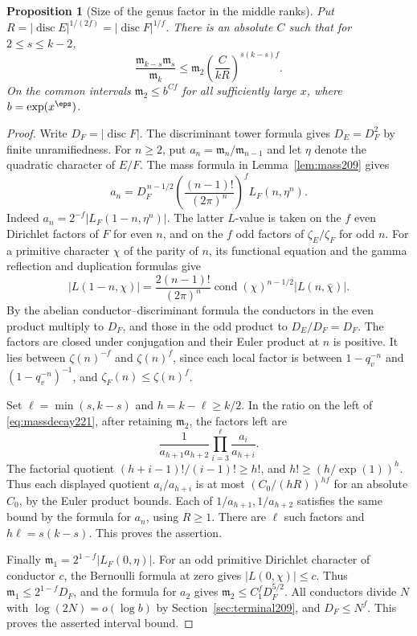\documentclass[a4paper,11pt]{article}
\newtheorem{proposition}{Proposition}[section]
\theoremstyle{definition}
\theoremstyle{remark}
\numberwithin{equation}{section}
\begin{document}
\begin{proposition}[Size of the genus factor in the middle ranks]
\label{prop:massdecay221}
Put \(R=|\operatorname{disc}E|^{1/(2f)}
       =|\operatorname{disc}F|^{1/f}\).
There is an absolute \(C\) such that for \(2\le s\le k-2\),
\begin{equation}
        \frac{\mathfrak m_{k-s}\mathfrak m_s}{\mathfrak m_k}
          \le \mathfrak m_2
                   \left(\frac{C}{kR}\right)^{s(k-s)f}.
                   \label{eq:massdecay221}
\end{equation}
On the common intervals \(\mathfrak m_2\le b^{C f}\) for
all sufficiently large \(x\), where \(b=\exp(x^\eps)\).
\end{proposition}
\begin{proof}
Write \(D_F=|\operatorname{disc}F|\). The discriminant tower
formula gives \(D_E=D_F^2\) by finite unramifiedness.
For \(n\ge2\), put \(a_n=\mathfrak m_n/\mathfrak m_{n-1}\)
and let \(\eta\) denote the quadratic character of \(E/F\).
The mass formula in Lemma~\ref{lem:mass209} gives
\[
 a_n=D_F^{\,n-1/2}
       \left(\frac{(n-1)!}{(2\pi)^n}\right)^f
                       L_F(n,\eta^n).
\]
Indeed \(a_n=2^{-f}|L_F(1-n,\eta^n)|\). The latter \(L\)-value
is taken on the \(f\) even Dirichlet factors of \(F\) for
even \(n\), and on the \(f\) odd factors of
\(\zeta_E/\zeta_F\) for odd \(n\). For a primitive character
\(\chi\) of the parity of \(n\), its functional equation and
the gamma reflection and duplication formulas give
\[
 |L(1-n,\chi)|=
  \frac{2(n-1)!}{(2\pi)^n}
       \operatorname{cond}(\chi)^{n-1/2}|L(n,\bar\chi)|.
\]
By the abelian conductor--discriminant formula the conductors
in the even product multiply to \(D_F\), and those in the
odd product to \(D_E/D_F=D_F\). The factors are closed under
conjugation and their Euler product at \(n\) is positive.
It lies between \(\zeta(n)^{-f}\) and \(\zeta(n)^f\), since
each local factor is between \(1-q_v^{-n}\) and
\((1-q_v^{-n})^{-1}\), and \(\zeta_F(n)\le\zeta(n)^f\).

Set \(\ell=\min(s,k-s)\) and \(h=k-\ell\ge k/2\).
In the ratio on the left of \eqref{eq:massdecay221}, after
retaining \(\mathfrak m_2\), the factors left are
\[
       \frac1{a_{h+1}a_{h+2}}
                  \prod_{i=3}^{\ell}\frac{a_i}{a_{h+i}} .
\]
The factorial quotient \((h+i-1)!/(i-1)!\ge h!\),
and \(h!\ge(h/\exp(1))^h\). Thus each displayed quotient
\(a_i/a_{h+i}\) is at most \((C_0/(hR))^{hf}\) for an
absolute \(C_0\), by the Euler product bounds. Each of
\(1/a_{h+1},1/a_{h+2}\) satisfies the same bound by the
formula for \(a_n\), using \(R\ge1\). There are \(\ell\)
such factors and \(h\ell=s(k-s)\). This proves the assertion.

Finally \(\mathfrak m_1=2^{1-f}|L_F(0,\eta)|\).
For an odd primitive Dirichlet character of conductor \(c\),
the Bernoulli formula at zero gives \(|L(0,\chi)|\le c\).
Thus \(\mathfrak m_1\le 2^{1-f}D_F\), and the formula for
\(a_2\) gives \(\mathfrak m_2\le C_1^f D_F^{5/2}\).
All conductors divide \(N\) with \(\log(2N)=o(\log b)\)
by Section~\ref{sec:terminal209}, and \(D_F\le N^f\).
This proves the asserted interval bound.
\end{proof}
\end{document}
